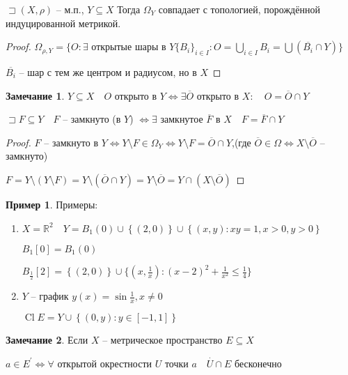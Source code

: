 \documentclass{book}
\newcommand\R{\ensuremath{\mathbb{R}}}
\newcommand{\p}[1]{#1^{\prime}}
\newcommand{\ov}[1]{\overline{#1}}
\DeclareMathOperator{\Cl}{Cl}
\theoremstyle{definition}
\newtheorem*{note}{Замечание}
\newtheorem*{example}{Пример}
\begin{document}
\begin{statement}
    $\sqsupset (X, \rho)$ -- м.п., $Y\subseteq X$ Тогда $\Omega_Y$ совпадает с топологией, порождённой индуцированной метрикой.
\end{statement}
\begin{proof}
    $\Omega_{\rho,Y} = \{O: \exists  \text{ открытые шары в } Y \{B_i\}_{i\in I}: O = \bigcup\limits_{i \in  I} B_i = \bigcup ( \ov{B_i} \cap Y) \}$

    $\ov{B_i}$ -- шар с тем же центром и радиусом, но в $X$
\end{proof}

\begin{note}
    $Y\subseteq X\quad O $ открыто в $Y \iff \exists \ov{O}$ открыто в $X:\quad O = \ov O \cap Y$

    $\sqsupset F\subseteq Y\quad F$ -- замкнуто (в $Y$)  $\iff  \exists $ замкнутое $\ov F $ в  $X\quad F = \ov F\cap Y$
\end{note}
\begin{proof}
    $F$ -- замкнуто в  $Y \iff  Y\setminus F\in \Omega_Y \iff  Y\setminus F = \ov O \cap Y$,(где $\ov O \in \Omega \iff  X\setminus \ov O$ -- замкнуто)

    $F = Y\setminus \left( Y\setminus F \right)  = Y\setminus (\ov O\cap Y) = Y\setminus \ov O = Y\cap (X\setminus \ov O)$
\end{proof}

\begin{example}
    Примеры:
    \begin{enumerate}
        \item $X = \R^2\quad Y = B_1(0)\cup \left\{ (2,0) \right\} \cup \left\{ (x,y): xy=1, x>0, y>0 \right\} $ 

            $B_1[0] = B_1(0)$

            $B_{\frac{1}{2}}[2] = \left\{ (2,0) \right\} \cup \{(x,\frac{1}{x}): (x-2)^2+\frac{1}{x^2}\leqslant \frac{1}{4}\}$

        \item $Y$ -- график  $y(x) = \sin \frac{1}{x}, x\neq 0$

            $\Cl E = Y\cup \left\{ (0,y):y\in [-1,1] \right\} $
    \end{enumerate}
\end{example}

\begin{note}
    Если $X$ -- метрическое пространство  $E\subseteq X$

    $a\in \p E \iff \forall $ открытой окрестности $U$ точки  $a\quad \overset{\cdot}U \cap E$ бесконечно
\end{note}
\end{document}
